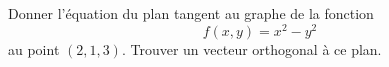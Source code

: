 
\begin{exercice}\label{exoOutilsMath-0057}

    Donner l'équation du plan tangent au graphe de la fonction
    \begin{equation}
        f(x,y)=x^2-y^2
    \end{equation}
    au point $(2,1,3)$. Trouver un vecteur orthogonal à ce plan.

\end{exercice}
